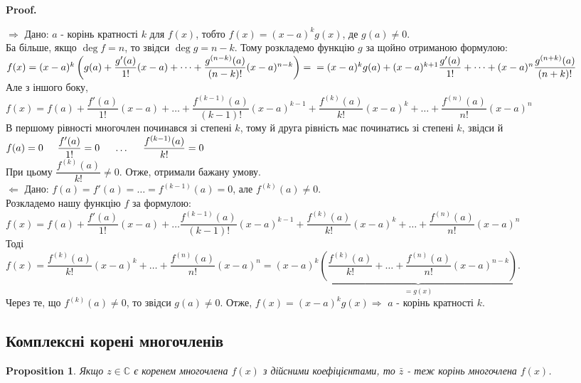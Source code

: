 \documentclass[a4paper, 10pt]{extarticle}
\makeatletter
\def\bigline{\vspace{5mm}\\}
\def\qed{$\blacksquare$}
\def\qed{$\blacksquare$}
\def\rightproof{$\boxed{\Rightarrow}$ }
\def\leftproof{$\boxed{\Leftarrow}$ }
\theoremstyle{theoremdd}
\theoremstyle{theoremdd}
\theoremstyle{theoremdd}
\theoremstyle{theoremdd}
\theoremstyle{theoremdd}
\newtheorem{proposition}[theorem]{Proposition}
\theoremstyle{theoremdd}
\theoremstyle{theoremdd}
\theoremstyle{theoremdd}
\renewenvironment{proof}[1][Proof.\\]{\par
\pushQED{\hfill \qed}%
\normalfont \topsep6\p@\@plus6\p@\relax
\trivlist
\item\relax
{\bfseries
#1\@addpunct{.}}\hspace\labelsep\ignorespaces
}{%
\popQED\endtrivlist\@endpefalse
}
\makeatother
\begin{document}
\begin{proof}
\rightproof Дано: $a$ - корінь кратності $k$ для $f(x)$, тобто $f(x) = (x-a)^k g(x)$, де $g(a) \neq 0$.\\
Ба більше, якщо $\deg f = n$, то звідси $\deg g = n-k$. Тому розкладемо функцію $g$ за щойно отриманою формулою:\\
$f(x) = (x-a)^k \left(g(a) + \dfrac{g'(a)}{1!}(x-a) + \dots + \dfrac{g^{(n-k)}(a)}{(n-k)!}(x-a)^{n-k} \right) = \\
= (x-a)^k g(a) + (x-a)^{k+1}\dfrac{g'(a)}{1!} + \dots + (x-a)^n\dfrac{g^{(n+k)}(a)}{(n+k)!}$\\
Але з іншого боку,\\
$f(x) = f(a) + \dfrac{f'(a)}{1!}(x-a) + \dots + \dfrac{f^{(k-1)}(a)}{(k-1)!}(x-a)^{k-1} + \dfrac{f^{(k)}(a)}{k!}(x-a)^{k} + \dots + \dfrac{f^{(n)}(a)}{n!}(x-a)^n$\\
В першому рівності многочлен починався зі степені $k$, тому й друга рівність має починатись зі степені $k$, звідси й\\
$f(a) = 0 \hspace{0.5 cm} \dfrac{f'(a)}{1!} = 0 \hspace{0.5 cm} \dots \hspace{0.5 cm} \dfrac{f^{(k-1)}(a)}{k!} = 0$\\
При цьому $\dfrac{f^{(k)}(a)}{k!} \neq 0$. Отже, отримали бажану умову.
\bigline
\leftproof Дано: $f(a)=f'(a)=\dots=f^{(k-1)}(a) =0$, але $f^{(k)}(a) \neq 0$.\\
Розкладемо нашу функцію $f$ за формулою:\\
$f(x) = f(a) + \dfrac{f'(a)}{1!}(x-a) + \dots \dfrac{f^{(k-1)}(a)}{(k-1)!}(x-a)^{k-1} + \dfrac{f^{(k)}(a)}{k!}(x-a)^{k} + \dots + \dfrac{f^{(n)}(a)}{n!}(x-a)^n$\\
Тоді\\
$f(x) = \dfrac{f^{(k)}(a)}{k!}(x-a)^{k} + \dots + \dfrac{f^{(n)}(a)}{n!}(x-a)^n = (x-a)^k \underbrace{\left(\dfrac{f^{(k)}(a)}{k!} + \dots + \dfrac{f^{(n)}(a)}{n!}(x-a)^{n-k} \right)}_{=g(x)}$.\\
Через те, що $f^{(k)}(a) \neq 0$, то звідси $g(a) \neq 0$. Отже, $f(x) = (x-a)^k g(x) \Rightarrow$ $a$ - корінь кратності $k$.
\end{proof}

\subsection{Комплексні корені многочленів}
\begin{proposition}
Якщо $z \in \mathbb{C}$ є коренем многочлена $f(x)$ з дійсними коефіцієнтами, то $\bar{z}$ - теж корінь многочлена $f(x)$.
\end{proposition}
\end{document}
